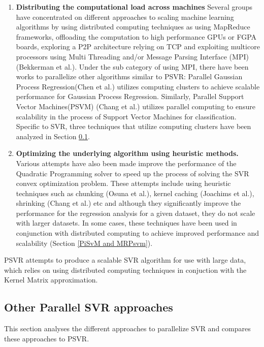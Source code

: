 \documentclass[12pt]{article}
\begin{document}
\begin{enumerate}[label=(\alph*)]
\item {\bf Distributing the computational load across machines}
\newline
Several groups have concentrated on different approaches to scaling machine learning algorithms by using distributed computing techniques as using MapReduce frameworks, offloading the computation to high performance GPUs or FGPA boards, exploring a P2P architecture relying on TCP and exploiting multicore processors using Multi Threading and/or Message Parsing Interface (MPI)(Bekkerman et al.).
\newline \newline
Under the sub category of using MPI, there have been works to parallelize other algorithms similar to PSVR: Parallel Gaussian Process Regression(Chen et al.) utilizes computing clusters to achieve scalable performance for Gaussian Process Regression. Similarly, Parallel Support Vector Machines(PSVM) (Chang et al.)  utilizes parallel computing to ensure scalability in the process of Support Vector Machines for classification. 
Specific to SVR, three techniques that utilize computing clusters have been analyzed in Section \ref{Other Parallel SVR approaches}.
\item {\bf Optimizing the underlying algorithm using heuristic methods.}
\newline
Various attempts have also been made improve the performance of the Quadratic Programming solver to speed up the process of solving the SVR convex optimization problem. These attempts include using heuristic techniques such as chunking (Osuna et al.), kernel caching (Joachims et al.), shrinking (Chang et al.) etc and although they significantly improve the performance for the regression analysis for a given dataset, they do not scale with larger datasets. In some cases, these techniques have been used in conjunction with distributed computing to achieve improved performance and scalability (Section \ref{PiSvM and MRPsvm}).
\end{enumerate}
PSVR attempts to produce a scalable SVR algorithm for use with large data, which relies on using distributed computing techniques in conjuction with the Kernel Matrix approximation.
\subsection{Other Parallel SVR approaches}
\label{Other Parallel SVR approaches}
This section analyses the different approaches to parallelize SVR and compares these approaches to PSVR.
\end{document}
